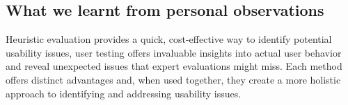 \subsection{What we learnt from personal observations}
Heuristic evaluation provides a quick, cost-effective way to identify potential usability issues, user testing offers invaluable insights into actual user behavior and reveal unexpected issues that expert evaluations might miss. Each method offers distinct advantages and, when used together, they create a more holistic approach to identifying and addressing usability issues.
